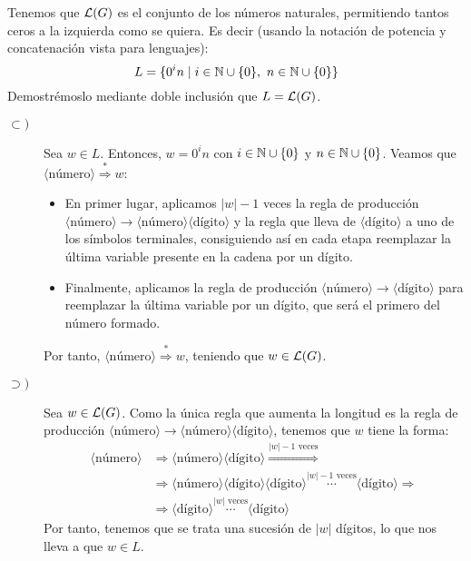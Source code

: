 \begin{ejercicio}
\begin{enumerate}
        Tenemos que $\mathcal{L}(G)$ es el conjunto de los números naturales, permitiendo
        tantos ceros a la izquierda como se quiera. Es decir (usando la notación de potencia y concatenación vista para lenguajes):
        \begin{equation*}
            L = \{0^i n \mid i\in \mathbb{N}\cup\{0\},~n\in \mathbb{N}\cup \{0\}\}
        \end{equation*}
        Demostrémoslo mediante doble inclusión que $L=\mathcal{L}(G)$.
        \begin{description}
            \item[$\subset)$] Sea $w\in L$. Entonces, $w=0^i n$ con $i\in \mathbb{N}\cup\{0\}$ y $n\in \mathbb{N}\cup \{0\}$. Veamos que
            $\langle \text{número} \rangle \stackrel{\ast}{\Longrightarrow} w$:
            \begin{itemize}
                \item En primer lugar, aplicamos $|w|-1$ veces la regla de producción $\langle \text{número} \rangle \rightarrow \langle \text{número} \rangle \langle \text{dígito} \rangle$ y la regla
                que lleva de $\langle \text{dígito} \rangle$ a uno de los símbolos terminales, consiguiendo así en cada etapa reemplazar
                la última variable presente en la cadena por un dígito.
                \item Finalmente, aplicamos la regla de producción $\langle \text{número} \rangle \rightarrow \langle \text{dígito} \rangle$ para reemplazar la última variable por un dígito, que será el primero del número formado.
            \end{itemize}
            Por tanto, $\langle \text{número} \rangle \stackrel{\ast}{\Longrightarrow} w$, teniendo que $w\in \mathcal{L}(G)$.

            \item[$\supset)$] Sea $w\in\mathcal{L}(G)$. Como la única regla que
            aumenta la longitud es la regla de producción $\langle \text{número} \rangle \rightarrow \langle \text{número} \rangle \langle \text{dígito} \rangle$, tenemos que $w$ tiene la forma:
            \begin{align*}
                \langle \text{número} \rangle &\Longrightarrow \langle \text{número} \rangle \langle \text{dígito} \rangle \stackrel{|w|-1\text{ veces}}{\Longrightarrow} \\
                &\Longrightarrow
                \langle \text{número} \rangle \langle \text{dígito} \rangle \langle \text{dígito} \rangle \stackrel{|w|-1\text{ veces}}{\cdots} \langle \text{dígito} \rangle
                \Longrightarrow \\& \Longrightarrow
                \langle \text{dígito} \rangle \stackrel{|w|\text{ veces}}{\cdots} \langle \text{dígito} \rangle
            \end{align*}
            Por tanto, tenemos que se trata una sucesión de $|w|$ dígitos, lo que nos lleva a que $w\in L$.
        \end{description}


\end{enumerate}
\end{ejercicio}
